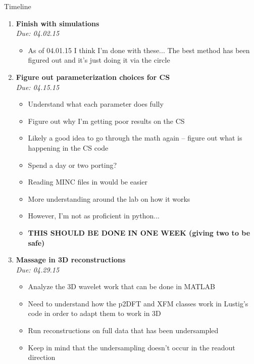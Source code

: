 \documentclass[11 pt]{article}
\newcommand{\bo}{\noindent\textbf}
\begin{document}
{\large{Timeline}}

      
\begin{enumerate}

      \item \bo{Finish with simulations}\\
	    \emph{Due: 04.02.15}
	    \begin{itemize}
      
		  \item As of 04.01.15 I think I'm done with these... The best method has been figured out and it's just doing it via the circle
      
	    \end{itemize}
      
      
      \item \bo{Figure out parameterization choices for CS}\\
	    \emph{Due: 04.15.15}
	    \begin{itemize}
		  \item Understand what each parameter does fully
		  \item Figure out why I'm getting poor results on the CS
		  \item Likely a good idea to go through the math again -- figure out what is happening in the CS code
		  \item Spend a day or two porting?
		  \item Reading MINC files in would be easier
		  \item More understanding around the lab on how it works 
		  \item However, I'm not as proficient in python...
		  \item \bo{THIS SHOULD BE DONE IN ONE WEEK (giving two to be safe)}
	    \end{itemize}
      
      
      \item \bo{Massage in 3D reconstructions}\\
	    \emph{Due: 04.29.15}
	    \begin{itemize}
		  \item Analyze the 3D wavelet work that can be done in MATLAB
		  \item Need to understand how the p2DFT and XFM classes work in Lustig's code in order to adapt them to work in 3D
		  \item Run reconstructions on full data that has been undersampled
		  \item Keep in mind that the undersampling doesn't occur in the readout direction
	    \end{itemize}


\end{enumerate}
\end{document}
